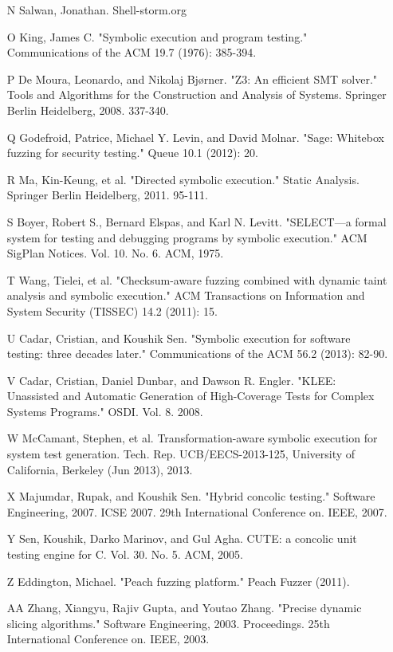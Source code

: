 \documentclass[11pt,expanded,copyright]{fsuthesis}
\begin{document}
\begin{itemize}
	\item [N] Salwan, Jonathan. Shell-storm.org %
	\item [O] King, James C. "Symbolic execution and program testing." Communications of the ACM 19.7 (1976): 385-394.
	\item [P] De Moura, Leonardo, and Nikolaj Bjørner. "Z3: An efficient SMT solver." Tools and Algorithms for the Construction and Analysis of Systems. Springer Berlin Heidelberg, 2008. 337-340.
	\item [Q] Godefroid, Patrice, Michael Y. Levin, and David Molnar. "Sage: Whitebox fuzzing for security testing." Queue 10.1 (2012): 20.
	\item [R] Ma, Kin-Keung, et al. "Directed symbolic execution." Static Analysis. Springer Berlin Heidelberg, 2011. 95-111.
	\item [S] Boyer, Robert S., Bernard Elspas, and Karl N. Levitt. "SELECT—a formal system for testing and debugging programs by symbolic execution." ACM SigPlan Notices. Vol. 10. No. 6. ACM, 1975.
	\item [T] Wang, Tielei, et al. "Checksum-aware fuzzing combined with dynamic taint analysis and symbolic execution." ACM Transactions on Information and System Security (TISSEC) 14.2 (2011): 15.
	\item [U] Cadar, Cristian, and Koushik Sen. "Symbolic execution for software testing: three decades later." Communications of the ACM 56.2 (2013): 82-90.
	\item [V] Cadar, Cristian, Daniel Dunbar, and Dawson R. Engler. "KLEE: Unassisted and Automatic Generation of High-Coverage Tests for Complex Systems Programs." OSDI. Vol. 8. 2008.
	\item [W] McCamant, Stephen, et al. Transformation-aware symbolic execution for system test generation. Tech. Rep. UCB/EECS-2013-125, University of California, Berkeley (Jun 2013), 2013.
	\item [X] Majumdar, Rupak, and Koushik Sen. "Hybrid concolic testing." Software Engineering, 2007. ICSE 2007. 29th International Conference on. IEEE, 2007.
	\item [Y] Sen, Koushik, Darko Marinov, and Gul Agha. CUTE: a concolic unit testing engine for C. Vol. 30. No. 5. ACM, 2005.
	\item [Z] Eddington, Michael. "Peach fuzzing platform." Peach Fuzzer (2011).
	\item [AA] Zhang, Xiangyu, Rajiv Gupta, and Youtao Zhang. "Precise dynamic slicing algorithms." Software Engineering, 2003. Proceedings. 25th International Conference on. IEEE, 2003.

\end{itemize}
\end{document}
